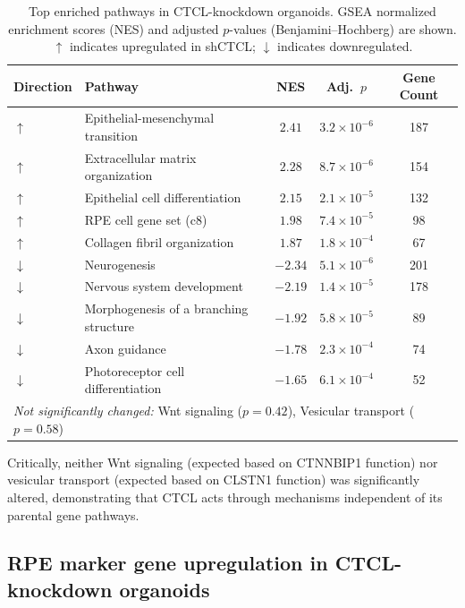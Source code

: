 \documentclass[11pt]{article}
\begin{document}
\begin{table}[H]
\centering
\caption{Top enriched pathways in CTCL-knockdown organoids. GSEA normalized enrichment scores (NES) and adjusted $p$-values (Benjamini--Hochberg) are shown. $\uparrow$ indicates upregulated in shCTCL; $\downarrow$ indicates downregulated.}
\label{tab:degs}
\begin{tabular}{llccc}
\toprule
\textbf{Direction} & \textbf{Pathway} & \textbf{NES} & \textbf{Adj.\ $p$} & \textbf{Gene Count} \\
\midrule
$\uparrow$ & Epithelial-mesenchymal transition & $2.41$ & $3.2 \times 10^{-6}$ & 187 \\
$\uparrow$ & Extracellular matrix organization & $2.28$ & $8.7 \times 10^{-6}$ & 154 \\
$\uparrow$ & Epithelial cell differentiation & $2.15$ & $2.1 \times 10^{-5}$ & 132 \\
$\uparrow$ & RPE cell gene set (c8) & $1.98$ & $7.4 \times 10^{-5}$ & 98 \\
$\uparrow$ & Collagen fibril organization & $1.87$ & $1.8 \times 10^{-4}$ & 67 \\
$\downarrow$ & Neurogenesis & $-2.34$ & $5.1 \times 10^{-6}$ & 201 \\
$\downarrow$ & Nervous system development & $-2.19$ & $1.4 \times 10^{-5}$ & 178 \\
$\downarrow$ & Morphogenesis of a branching structure & $-1.92$ & $5.8 \times 10^{-5}$ & 89 \\
$\downarrow$ & Axon guidance & $-1.78$ & $2.3 \times 10^{-4}$ & 74 \\
$\downarrow$ & Photoreceptor cell differentiation & $-1.65$ & $6.1 \times 10^{-4}$ & 52 \\
\midrule
\multicolumn{5}{l}{\textit{Not significantly changed:} Wnt signaling ($p = 0.42$), Vesicular transport ($p = 0.58$)} \\
\bottomrule
\end{tabular}
\end{table}

Critically, neither Wnt signaling (expected based on CTNNBIP1 function) nor vesicular transport (expected based on CLSTN1 function) was significantly altered, demonstrating that CTCL acts through mechanisms independent of its parental gene pathways.

\subsection{RPE marker gene upregulation in CTCL-knockdown organoids}
\end{document}
